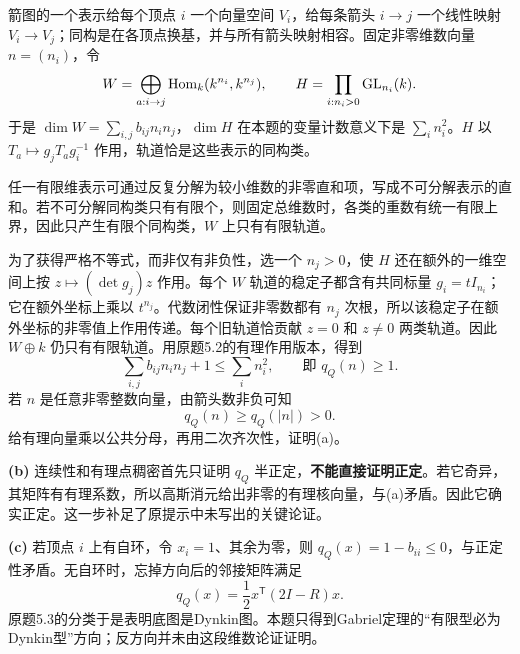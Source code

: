 \begin{solution}
箭图的一个表示给每个顶点 $i$ 一个向量空间 $V_i$，给每条箭头 $i\to j$ 一个线性映射 $V_i\to V_j$；同构是在各顶点换基，并与所有箭头映射相容。固定非零维数向量 $n=(n_i)$，令
\[
 W=\bigoplus_{a:i\to j}\operatorname{Hom}_k(k^{n_i},k^{n_j}),\qquad
 H=\prod_{i:n_i>0}\operatorname{GL}_{n_i}(k).
\]
于是 $\dim W=\sum_{i,j}b_{ij}n_i n_j$，$\dim H$ 在本题的变量计数意义下是 $\sum_i n_i^2$。$H$ 以 $T_a\mapsto g_jT_ag_i^{-1}$ 作用，轨道恰是这些表示的同构类。

任一有限维表示可通过反复分解为较小维数的非零直和项，写成不可分解表示的直和。若不可分解同构类只有有限个，则固定总维数时，各类的重数有统一有限上界，因此只产生有限个同构类，$W$ 上只有有限轨道。

为了获得严格不等式，而非仅有非负性，选一个 $n_j>0$，使 $H$ 还在额外的一维空间上按 $z\mapsto(\det g_j)z$ 作用。每个 $W$ 轨道的稳定子都含有共同标量 $g_i=tI_{n_i}$；它在额外坐标上乘以 $t^{n_j}$。代数闭性保证非零数都有 $n_j$ 次根，所以该稳定子在额外坐标的非零值上作用传递。每个旧轨道恰贡献 $z=0$ 和 $z\ne0$ 两类轨道。因此 $W\oplus k$ 仍只有有限轨道。用原题5.2的有理作用版本，得到
\[
 \sum_{i,j}b_{ij}n_i n_j+1\le\sum_i n_i^2,
 \qquad\text{即 }q_Q(n)\ge1.
\]
若 $n$ 是任意非零整数向量，由箭头数非负可知
\[
 q_Q(n)\ge q_Q(|n|)>0.
\]
给有理向量乘以公共分母，再用二次齐次性，证明(a)。

\textbf{(b)} 连续性和有理点稠密首先只证明 $q_Q$ 半正定，\textbf{不能直接证明正定}。若它奇异，其矩阵有有理系数，所以高斯消元给出非零的有理核向量，与(a)矛盾。因此它确实正定。这一步补足了原提示中未写出的关键论证。

\textbf{(c)} 若顶点 $i$ 上有自环，令 $x_i=1$、其余为零，则 $q_Q(x)=1-b_{ii}\le0$，与正定性矛盾。无自环时，忘掉方向后的邻接矩阵满足
\[
 q_Q(x)=\frac12x^{\mathsf T}(2I-R)x.
\]
原题5.3的分类于是表明底图是Dynkin图。本题只得到Gabriel定理的“有限型必为Dynkin型”方向；反方向并未由这段维数论证证明。
\end{solution}

